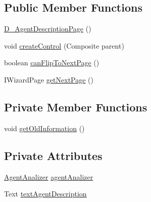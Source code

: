 \subsection*{Public Member Functions}
\begin{DoxyCompactItemize}
\item 
\hyperlink{classit_1_1isislab_1_1masonhelperdocumentation_1_1mason_1_1wizards_1_1_d___agent_description_page_a16a7daf2bc98cdfde170aa29c028ba06}{D\-\_\-\-Agent\-Description\-Page} ()
\item 
void \hyperlink{classit_1_1isislab_1_1masonhelperdocumentation_1_1mason_1_1wizards_1_1_d___agent_description_page_a54ede11092f7bd9db6cc381862180450}{create\-Control} (Composite parent)
\item 
boolean \hyperlink{classit_1_1isislab_1_1masonhelperdocumentation_1_1mason_1_1wizards_1_1_d___agent_description_page_a2d82f96c4241c29fef9f80b28982f9a9}{can\-Flip\-To\-Next\-Page} ()
\item 
I\-Wizard\-Page \hyperlink{classit_1_1isislab_1_1masonhelperdocumentation_1_1mason_1_1wizards_1_1_d___agent_description_page_afc7ea33cd58dacc353ffd209027279fc}{get\-Next\-Page} ()
\end{DoxyCompactItemize}
\subsection*{Private Member Functions}
\begin{DoxyCompactItemize}
\item 
void \hyperlink{classit_1_1isislab_1_1masonhelperdocumentation_1_1mason_1_1wizards_1_1_d___agent_description_page_aa774dfe04837b0b796d9e292aa3935be}{get\-Old\-Information} ()
\end{DoxyCompactItemize}
\subsection*{Private Attributes}
\begin{DoxyCompactItemize}
\item 
\hyperlink{classit_1_1isislab_1_1masonhelperdocumentation_1_1analizer_1_1_agent_analizer}{Agent\-Analizer} \hyperlink{classit_1_1isislab_1_1masonhelperdocumentation_1_1mason_1_1wizards_1_1_d___agent_description_page_a2a9e05cc43fedb16d75050620d30f712}{agent\-Analizer}
\item 
Text \hyperlink{classit_1_1isislab_1_1masonhelperdocumentation_1_1mason_1_1wizards_1_1_d___agent_description_page_adeaf5a5649c9280ceb38690357c70a1b}{text\-Agent\-Description}
\end{DoxyCompactItemize}

